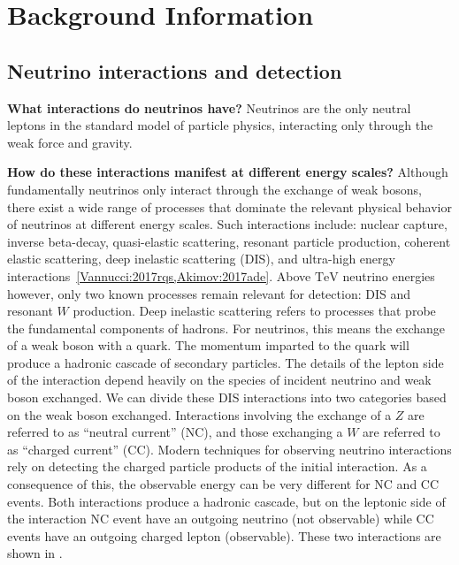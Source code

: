 \chapter{Background Information}

\section{Neutrino interactions and detection}

\textbf{What interactions do neutrinos have?}
Neutrinos are the only neutral leptons in the standard model of particle physics, interacting only through the weak force and gravity.

\textbf{How do these interactions manifest at different energy scales?}
Although fundamentally neutrinos only interact through the exchange of weak bosons, there exist a wide range of processes that dominate the relevant physical behavior of neutrinos at different energy scales.
Such interactions include: nuclear capture, inverse beta-decay, quasi-elastic scattering, resonant particle production, coherent elastic scattering, deep inelastic scattering (DIS), and ultra-high energy interactions~\ref{Vannucci:2017rqs,Akimov:2017ade}.
Above $\si\TeV$ neutrino energies however, only two known processes remain relevant for detection: DIS and resonant $W$ production.
Deep inelastic scattering refers to processes that probe the fundamental components of hadrons.
For neutrinos, this means the exchange of a weak boson with a quark.
The momentum imparted to the quark will produce a hadronic cascade of secondary particles.
The details of the lepton side of the interaction depend heavily on the species of incident neutrino and weak boson exchanged.
We can divide these DIS interactions into two categories based on the weak boson exchanged.
Interactions involving the exchange of a $Z$ are referred to as ``neutral current'' (NC), and those exchanging a $W$ are referred to as ``charged current'' (CC).
Modern techniques for observing neutrino interactions rely on detecting the charged particle products of the initial interaction.
As a consequence of this, the observable energy can be very different for NC and CC events.
Both interactions produce a hadronic cascade, but on the leptonic side of the interaction NC event have an outgoing neutrino (not observable) while CC events have an outgoing charged lepton (observable).
These two interactions are shown in .

